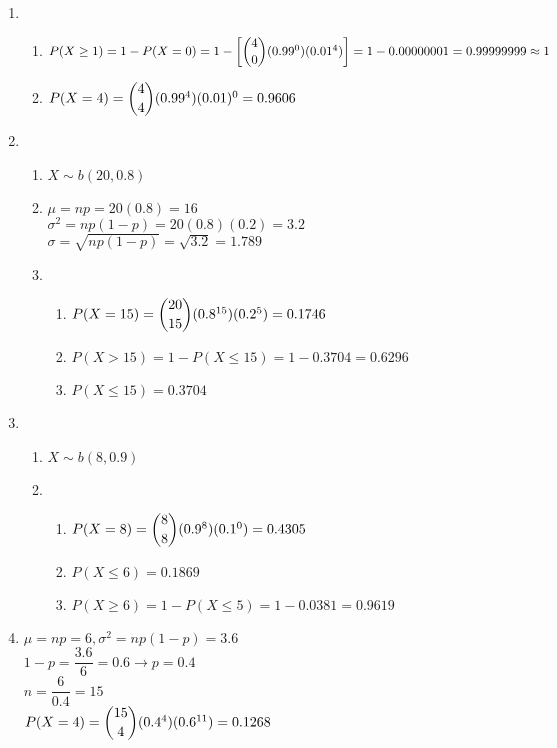 \documentclass{article}
\begin{document}
\begin{enumerate}
     \item
      \begin{enumerate}
       \item 
	$P(X \ge 1) = 1 - P(X = 0) = 1 - \left[\dbinom{4}{0}(0.99^0)(0.01^4)\right] = 1 - 0.00000001
	  = 0.99999999 \approx 1$
       \item
	$P(X = 4) = \dbinom{4}{4}(0.99^4)(0.01)^0 = 0.9606$
      \end{enumerate}
      
     \item
      \begin{enumerate}
       \item $X \sim b(20, 0.8)$
       \item
	$\mu = np = 20(0.8) = 16$ \\
	$\sigma^2 = np(1-p) = 20(0.8)(0.2) = 3.2$ \\
	$\sigma = \sqrt{np(1-p)} = \sqrt{3.2} = 1.789$
       \item
	\begin{enumerate}
	 \item 
	  $P(X = 15) = \dbinom{20}{15}(0.8^{15})(0.2^5) = 0.1746$
	 \item
	  $P(X > 15) = 1 - P(X \le 15) = 1 - 0.3704 = 0.6296$
	 \item
	  $P(X \le 15) = 0.3704$
	\end{enumerate}
      \end{enumerate}

     \item
      \begin{enumerate}
       \item $X \sim b(8, 0.9)$
       \item
	\begin{enumerate}
	 \item 
	  $P(X = 8) = \dbinom{8}{8}(0.9^8)(0.1^0) = 0.4305$
	 \item
	  $P(X \le 6) = 0.1869$
	 \item
	  $P(X \ge 6) = 1 - P(X \le 5) = 1 - 0.0381 = 0.9619$
	\end{enumerate}
      \end{enumerate}

     \item
      $\mu = np = 6, \sigma^2 = np(1-p) = 3.6$ \\
      $1-p = \dfrac{3.6}{6} = 0.6 \rightarrow p = 0.4$ \\
      $n = \dfrac{6}{0.4} = 15$ \\
      $P(X = 4) = \dbinom{15}{4}(0.4^4)(0.6^{11}) = 0.1268$
     \addtocounter{enumi}{1}
    

\end{enumerate}
\end{document}
